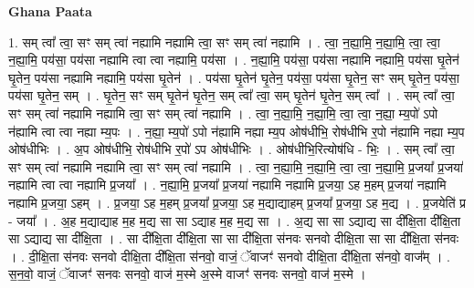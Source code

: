 \documentclass[17pt]{extarticle}
\begin{document}
\textbf{Ghana Paata } \newline

1. सम् त्वा᳚ त्वा॒ सꣳ सम् त्वा॑ नह्यामि नह्यामि त्वा॒ सꣳ सम् त्वा॑ नह्यामि । . त्वा॒ न॒ह्या॒मि॒ न॒ह्या॒मि॒ त्वा॒ त्वा॒ न॒ह्या॒मि॒ पय॑सा॒ पय॑सा नह्यामि त्वा त्वा नह्यामि॒ पय॑सा । . न॒ह्या॒मि॒ पय॑सा॒ पय॑सा नह्यामि नह्यामि॒ पय॑सा घृ॒तेन॑ घृ॒तेन॒ पय॑सा नह्यामि नह्यामि॒ पय॑सा घृ॒तेन॑ । . पय॑सा घृ॒तेन॑ घृ॒तेन॒ पय॑सा॒ पय॑सा घृ॒तेन॒ सꣳ सम् घृ॒तेन॒ पय॑सा॒ पय॑सा घृ॒तेन॒ सम् । . घृ॒तेन॒ सꣳ सम् घृ॒तेन॑ घृ॒तेन॒ सम् त्वा᳚ त्वा॒ सम् घृ॒तेन॑ घृ॒तेन॒ सम् त्वा᳚ । . सम् त्वा᳚ त्वा॒ सꣳ सम् त्वा॑ नह्यामि नह्यामि त्वा॒ सꣳ सम् त्वा॑ नह्यामि । . त्वा॒ न॒ह्या॒मि॒ न॒ह्या॒मि॒ त्वा॒ त्वा॒ न॒ह्या॒ म्य॒पो॑ ऽपो न॑ह्यामि त्वा त्वा नह्या म्य॒पः । . न॒ह्या॒ म्य॒पो॑ ऽपो न॑ह्यामि नह्या म्य॒प ओष॑धीभि॒ रोष॑धीभि र॒पो न॑ह्यामि नह्या म्य॒प ओष॑धीभिः । . अ॒प ओष॑धीभि॒ रोष॑धीभि र॒पो॑ ऽप ओष॑धीभिः । . ओष॑धीभि॒रित्योष॑धि - भिः॒ । . सम् त्वा᳚ त्वा॒ सꣳ सम् त्वा॑ नह्यामि नह्यामि त्वा॒ सꣳ सम् त्वा॑ नह्यामि । . त्वा॒ न॒ह्या॒मि॒ न॒ह्या॒मि॒ त्वा॒ त्वा॒ न॒ह्या॒मि॒ प्र॒जया᳚ प्र॒जया॑ नह्यामि त्वा त्वा नह्यामि प्र॒जया᳚ । . न॒ह्या॒मि॒ प्र॒जया᳚ प्र॒जया॑ नह्यामि नह्यामि प्र॒जया॒ ऽह म॒हम् प्र॒जया॑ नह्यामि नह्यामि प्र॒जया॒ ऽहम् । . प्र॒जया॒ ऽह म॒हम् प्र॒जया᳚ प्र॒जया॒ ऽह म॒द्याद्याहम् प्र॒जया᳚ प्र॒जया॒ ऽह म॒द्य । . प्र॒जयेति॑ प्र - जया᳚ । . अ॒ह म॒द्याद्याह म॒ह म॒द्य सा सा ऽद्याह म॒ह म॒द्य सा । . अ॒द्य सा सा ऽद्याद्य सा दी᳚क्षि॒ता दी᳚क्षि॒ता सा ऽद्याद्य सा दी᳚क्षि॒ता । . सा दी᳚क्षि॒ता दी᳚क्षि॒ता सा सा दी᳚क्षि॒ता स॑नवः सनवो दीक्षि॒ता सा सा दी᳚क्षि॒ता स॑नवः । . दी॒क्षि॒ता स॑नवः सनवो दीक्षि॒ता दी᳚क्षि॒ता स॑नवो॒ वाजं॒ ॅवाजꣳ॑ सनवो दीक्षि॒ता दी᳚क्षि॒ता स॑नवो॒ वाज᳚म् । . स॒न॒वो॒ वाजं॒ ॅवाजꣳ॑ सनवः सनवो॒ वाज॑ म॒स्मे अ॒स्मे वाजꣳ॑ सनवः सनवो॒ वाज॑ म॒स्मे । \newline
\end{document}
